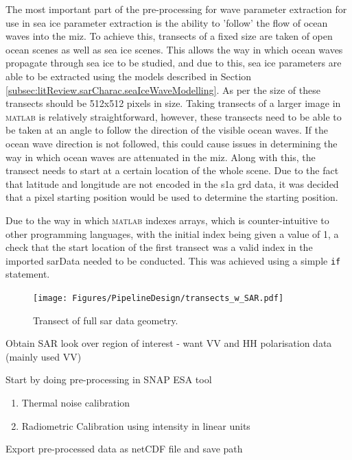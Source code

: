 The most important part of the pre-processing for wave parameter extraction for use in sea ice parameter extraction is the ability to 'follow' the flow of ocean waves into the \acs{miz}. To achieve this, transects of a fixed size are taken of open ocean scenes as well as sea ice scenes. This allows the way in which ocean waves propagate through sea ice to be studied, and due to this, sea ice parameters are able to be extracted using the models described in Section \ref{subsec:litReview.sarCharac.seaIceWaveModelling}. As per \cite{Wadhams2004,DeSanti2018} the size of these transects should be 512x512 pixels in size. Taking transects of a larger image in \textsc{matlab} is relatively straightforward, however, these transects need to be able to be taken at an angle to follow the direction of the visible ocean waves. If the ocean wave direction is not followed, this could cause issues in determining the way in which ocean waves are attenuated in the \acs{miz}. Along with this, the transect needs to start at a certain location of the whole scene. Due to the fact that latitude and longitude are not encoded in the \acs{s1a} \ac{grd} data, it was decided that a pixel starting position would be used to determine the starting position.

Due to the way in which \textsc{matlab} indexes arrays, which is counter-intuitive to other programming languages, with the initial index being given a value of \textsc{1}, a check that the start location of the first transect was a valid index in the imported sarData needed to be conducted. This was achieved using a simple \lstinline{if} statement.

\begin{figure}[H]
    \centering
    \texttt{[image: Figures/PipelineDesign/transects\_w\_SAR.pdf]}
    \caption{Transect of full \acs{sar} data geometry.}
    \label{fig:systemDesign.transects}
\end{figure}



Obtain SAR look over region of interest - want VV and HH polarisation data (mainly used VV)

Start by doing pre-processing in SNAP ESA tool
\begin{enumerate}
    \item Thermal noise calibration
    \item Radiometric Calibration using intensity in linear units
\end{enumerate}

Export pre-processed data as netCDF file and save path

